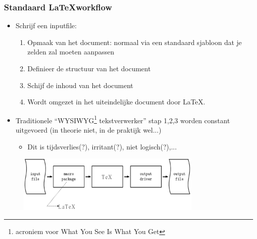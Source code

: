 \documentclass{beamer}
\begin{document}

\begin{frame}
\frametitle{Standaard \LaTeX workflow}
\begin{itemize}
 \item Schrijf een inputfile: 
    \begin{enumerate}
      \item Opmaak van het document: normaal via een standaard sjabloon dat je zelden zal moeten aanpassen
      \item Definieer de structuur van het document
      \item Schijf de inhoud van het document
      \item Wordt omgezet in het uiteindelijke document door \LaTeX.
      \end{enumerate}
\pause
 \item Traditionele ``WYSIWYG\footnote{acroniem voor What You See Is What You Get} tekstverwerker'' stap 1,2,3 worden constant uitgevoerd (in theorie niet, in de praktijk wel...) 
    \begin{itemize}
    \item Dit is tijdsverlies(?), irritant(?), niet logisch(?),...
      \end{itemize}
\end{itemize}
\begin{figure}[h] 
  \includegraphics[width=0.8\textwidth]{images/workflow.png}
\end{figure}
\end{frame}

\end{document}
